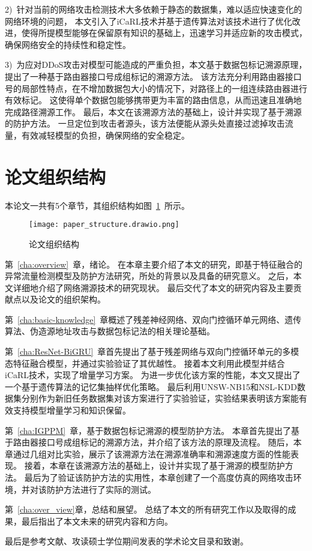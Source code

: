 2)~针对当前的网络攻击检测技术大多依赖于静态的数据集，难以适应快速变化的网络环境的问题，
本文引入了iCaRL技术并基于遗传算法对该技术进行了优化改进，使得所提模型能够在保留原有知识的基础上，迅速学习并适应新的攻击模式，确保网络安全的持续性和稳定性。\par

3)~为应对DDoS攻击对模型可能造成的严重负担，本文基于数据包标记溯源原理，提出了一种基于路由器接口号成组标记的溯源方法。
该方法充分利用路由器接口号的局部性特点，在不增加数据包大小的情况下，对路径上的一组连续路由器进行有效标记。             
这使得单个数据包能够携带更为丰富的路由信息，从而迅速且准确地完成路径溯源工作。
最后，本文在该溯源方法的基础上，设计并实现了基于溯源的防护方法。
一旦定位到攻击者源头，该方法便能从源头处直接过滤掉攻击流量，有效减轻模型的负担，确保网络的安全稳定。\par

\section{论文组织结构}
本论文一共有5个章节，其组织结构如图~\ref{fig:paper_structure}~所示。
\begin{figure}[h]
  \centering
  \texttt{[image: paper\_structure.drawio.png]}
  \caption{论文组织结构}
  \label{fig:paper_structure}
\end{figure}

第~\ref{cha:overview}~章，绪论。
在本章主要介绍了本文的研究，即基于特征融合的异常流量检测模型及防护方法研究，所处的背景以及具备的研究意义。
之后，本文详细地介绍了网络溯源技术的研究现状。
最后交代了本文的研究内容及主要贡献点以及论文的组织架构。


第~\ref{cha:basic-knowledge}~章概述了残差神经网络、双向门控循环单元网络、遗传算法、伪造源地址攻击与数据包标记法的相关理论基础。

第~\ref{cha:ResNet-BiGRU}~章首先提出了基于残差网络与双向门控循环单元的多模态特征融合模型，并通过实验验证了其优越性。
接着本文利用此模型并结合iCaRL技术，实现了增量学习方案。
为进一步优化该方案的性能，本文又提出了一个基于遗传算法的记忆集抽样优化策略。
最后利用UNSW-NB15和NSL-KDD数据集分别作为新旧任务数据集对该方案进行了实验验证，实验结果表明该方案能有效支持模型增量学习和知识保留。

第~\ref{cha:IGPPM}~章，基于数据包标记溯源的模型防护方法。
本章首先提出了基于路由器接口号成组标记的溯源方法，并介绍了该方法的原理及流程。
随后，本章通过几组对比实验，展示了该溯源方法在溯源准确率和溯源速度方面的性能表现。
接着，本章在该溯源方法的基础上，设计并实现了基于溯源的模型防护方法。
最后为了验证该防护方法的实用性，本章创建了一个高度仿真的网络攻击环境，并对该防护方法进行了实际的测试。

第~\ref{cha:over_view}章，总结和展望。
总结了本文的所有研究工作以及取得的成果，最后指出了本文未来的研究内容和方向。

最后是参考文献、攻读硕士学位期间发表的学术论文目录和致谢。
